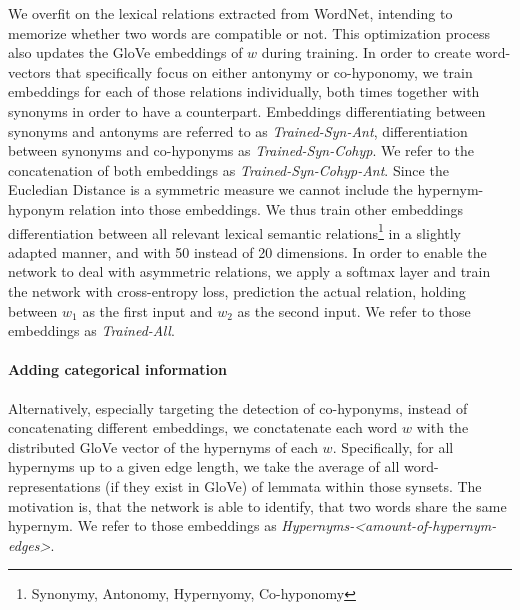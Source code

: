 We overfit on the lexical relations extracted from WordNet, intending to memorize whether two words are compatible or not. This optimization process also updates the GloVe embeddings of $w$ during training. In order to create word-vectors that specifically focus on either antonymy or co-hyponomy, we train embeddings for each of those relations individually, both times together with synonyms in order to have a counterpart. Embeddings differentiating between synonyms and antonyms are referred to as \textit{Trained-Syn-Ant}, differentiation between synonyms and co-hyponyms as \textit{Trained-Syn-Cohyp}. We refer to the concatenation of both embeddings as \textit{Trained-Syn-Cohyp-Ant}. Since the Eucledian Distance is a symmetric measure we cannot include the hypernym-hyponym relation into those embeddings. We thus train other embeddings differentiation between all relevant lexical semantic relations\footnote{Synonymy, Antonomy, Hypernyomy, Co-hyponomy} in a slightly adapted manner, and with 50 instead of 20 dimensions. In order to enable the network to deal with asymmetric relations, we apply a softmax layer and train the network with cross-entropy loss, prediction the actual relation, holding between $w_1$ as the first input and $w_2$ as the second input. We refer to those embeddings as \textit{Trained-All}.
\paragraph*{Adding categorical information}
Alternatively, especially targeting the detection of co-hyponyms, instead of concatenating different embeddings, we conctatenate each word $w$ with the distributed GloVe vector of the hypernyms of each $w$. Specifically, for all hypernyms up to a given edge length, we take the average of all word-representations (if they exist in GloVe) of lemmata within those synsets. The motivation is, that the network is able to identify, that two words share the same hypernym. We refer to those embeddings as \textit{Hypernyms-<amount-of-hypernym-edges>}.
